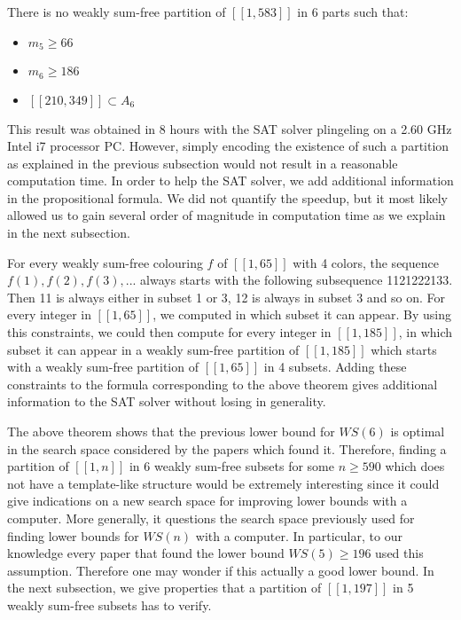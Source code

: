 \begin{computational theorem}
There is no weakly sum-free partition of \([\![1,583]\!]\) in 6 parts such that:
\begin{itemize}
	\item \(m_5 \geqslant 66\)
	\item \(m_6 \geqslant 186\)
	\item \([\![210,349]\!] \subset A_6\)
\end{itemize}
\end{computational theorem}

This result was obtained in 8 hours with the SAT solver plingeling \cite{Lingeling2017} on a 2.60 GHz Intel
i7 processor PC.
However, simply encoding the existence of such a partition as explained in the previous subsection would not result in a
reasonable
computation time. In order to help the SAT solver, we add additional information in the propositional formula. We did
not quantify the
speedup, but it most likely allowed us to gain several order of magnitude in computation time as we explain in the next
subsection.

\par
For every weakly sum-free colouring \(f\) of \([\![1,65]\!]\) with 4 colors, the sequence \(f(1), f(2), f(3), ...\) always 
starts with the following subsequence 1121222133. Then 11 is always
either in subset 1 or 3, 12 is always in subset 3 and so on. For every integer in \([\![1,65]\!]\), we computed in which
subset it can appear.
By using this constraints, we could then compute for every integer in \([\![1,185]\!]\), in which subset it can appear
in a weakly sum-free
partition of \([\![1,185]\!]\) which starts with a weakly sum-free partition of \([\![1,65]\!]\) in 4 subsets. Adding
these constraints to the
formula corresponding to the above theorem gives additional information to the SAT solver without losing in generality.

\par
The above theorem shows that the previous lower bound for \(WS(6)\) is optimal in the search space considered by the
papers which found it.
Therefore, finding a partition of \([\![1,n]\!]\) in 6 weakly sum-free subsets for some \(n \geqslant 590\) which does
not have a template-like structure
would be extremely interesting since it could give indications on a new search space for improving lower bounds with a
computer. More generally,
it questions the search space previously used for finding lower bounds for \(WS(n)\) with a computer. In particular, to
our knowledge every paper
that found the lower bound \(WS(5) \geqslant 196\) used this assumption. Therefore one may wonder
if this actually a good lower
bound. In the next subsection, we give properties that a partition of \([\![1,197]\!]\) in 5 weakly sum-free subsets has
to verify.


